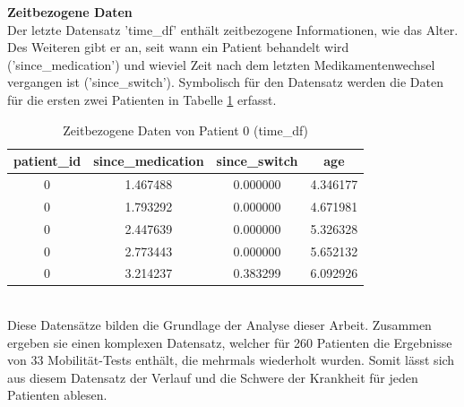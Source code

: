 \documentclass[%
thesis=student,%
coverpage=false,%
titlepage=false,%
headmarks=true, %
german,%
font=libertine, %
math=newpxtx, %
BCOR=5mm,%
coverBCOR=11mm%
]{tumbook}
\theoremstyle{break}
\begin{document}
\textbf{Zeitbezogene Daten} \\
Der letzte Datensatz 'time\_df' enthält zeitbezogene Informationen, wie das Alter. Des Weiteren gibt er an, seit wann ein Patient behandelt wird ('since\_medication') und wieviel Zeit nach dem letzten Medikamentenwechsel vergangen ist ('since\_switch'). Symbolisch für den Datensatz werden die Daten für die ersten zwei Patienten in Tabelle \ref{table:time_df} erfasst.\\
\begin{table}[ht]
	\centering
	\small
	\begin{tabular}{|c|c|c|c|}
		\hline
		patient\_id & since\_medication & since\_switch & age \\
		\hline
		0 & 1.467488 & 0.000000 & 4.346177 \\
		0 & 1.793292 & 0.000000 & 4.671981 \\
		0 & 2.447639 & 0.000000 & 5.326328 \\
		0 & 2.773443 & 0.000000 & 5.652132 \\
		0 & 3.214237 & 0.383299 & 6.092926 \\
		\hline
	\end{tabular}
	\caption{Zeitbezogene Daten von Patient 0 (time\_df)}
	\label{table:time_df}
\end{table}
\\ 
Diese Datensätze bilden die Grundlage der Analyse dieser Arbeit. Zusammen ergeben sie einen komplexen Datensatz, welcher für 260 Patienten die Ergebnisse von 33 Mobilität-Tests enthält, die mehrmals wiederholt wurden. Somit lässt sich aus diesem Datensatz der Verlauf und die Schwere der Krankheit für jeden Patienten ablesen.
\end{document}
